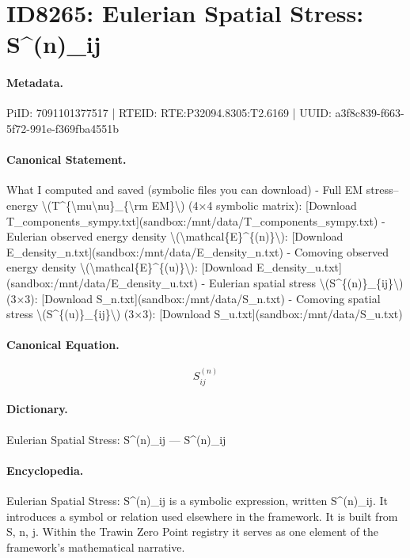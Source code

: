 \section*{ID8265: Eulerian Spatial Stress: S\textasciicircum{}(n)\_ij}
\paragraph{Metadata.}
PiID: 7091101377517 | RTEID: RTE:P32094.8305:T2.6169 | UUID: a3f8c839-f663-5f72-991e-f369fba4551b

\paragraph{Canonical Statement.}
What I computed and saved (symbolic files you can download) - Full EM stress–energy \textbackslash{}(T\textasciicircum{}\{\textbackslash{}mu\textbackslash{}nu\}\_\{\textbackslash{}rm EM\}\textbackslash{}) (4×4 symbolic matrix): [Download T\_components\_sympy.txt](sandbox:/mnt/data/T\_components\_sympy.txt) - Eulerian observed energy density \textbackslash{}(\textbackslash{}mathcal\{E\}\textasciicircum{}\{(n)\}\textbackslash{}): [Download E\_density\_n.txt](sandbox:/mnt/data/E\_density\_n.txt) - Comoving observed energy density \textbackslash{}(\textbackslash{}mathcal\{E\}\textasciicircum{}\{(u)\}\textbackslash{}): [Download E\_density\_u.txt](sandbox:/mnt/data/E\_density\_u.txt) - Eulerian spatial stress \textbackslash{}(S\textasciicircum{}\{(n)\}\_\{ij\}\textbackslash{}) (3×3): [Download S\_n.txt](sandbox:/mnt/data/S\_n.txt) - Comoving spatial stress \textbackslash{}(S\textasciicircum{}\{(u)\}\_\{ij\}\textbackslash{}) (3×3): [Download S\_u.txt](sandbox:/mnt/data/S\_u.txt)

\paragraph{Canonical Equation.}
\[
S^{(n)}_{ij}
\]

\paragraph{Dictionary.}
Eulerian Spatial Stress: S\textasciicircum{}(n)\_ij — S\textasciicircum{}(n)\_ij

\paragraph{Encyclopedia.}
Eulerian Spatial Stress: S\textasciicircum{}(n)\_ij is a symbolic expression, written S\textasciicircum{}(n)\_ij. It introduces a symbol or relation used elsewhere in the framework. It is built from S, n, j. Within the Trawin Zero Point registry it serves as one element of the framework's mathematical narrative.
